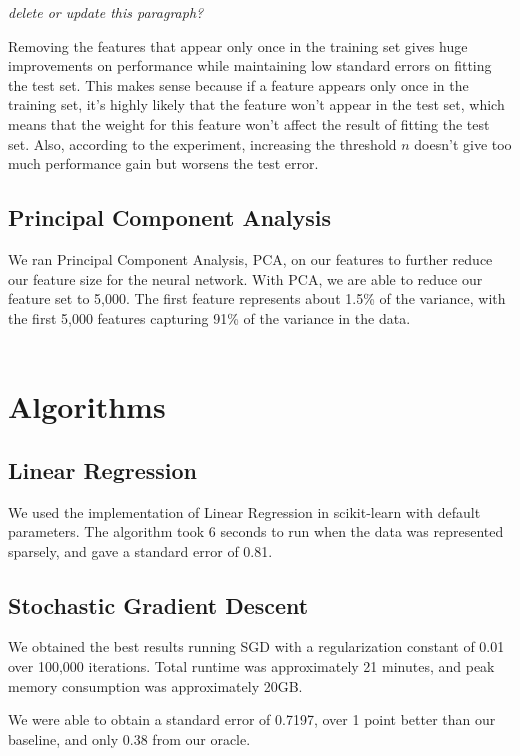 \documentclass[journal]{IEEEtran}
\begin{document}
\textit{delete or update this paragraph?}
\par Removing the features that
appear only once in the training set gives huge improvements on performance
while maintaining low standard errors on fitting the test set. This makes sense
because if a
feature appears only once in the training set, it's highly likely that the
feature won't appear in the test set, which means that the weight for this feature
won't affect the result of fitting the test set. Also, according to the experiment,
increasing the threshold $n$ doesn't give too much performance gain but worsens
the test error.

\subsection{Principal Component Analysis}
We ran Principal Component Analysis, PCA, on our features to further reduce
our feature size for the neural network. With PCA, we
are able to reduce our feature set to 5,000.  The first feature
represents about 1.5\% of the variance, with the first 5,000 features
capturing 91\% of the variance in the data.
\\
\\

\section{Algorithms}

\subsection{Linear Regression}
We used the implementation of Linear Regression in scikit-learn with default
parameters. The algorithm took 6 seconds to run when the data was represented
sparsely, and gave a standard error of 0.81.

\subsection{Stochastic Gradient Descent}

We obtained the best results running SGD with a regularization constant of 0.01 over 100,000 iterations.  Total runtime was approximately 21 minutes, and peak memory consumption was approximately 20GB.

We were able to obtain a standard error of 0.7197, over 1 point better than our baseline,
and only 0.38 from our oracle.
\end{document}
